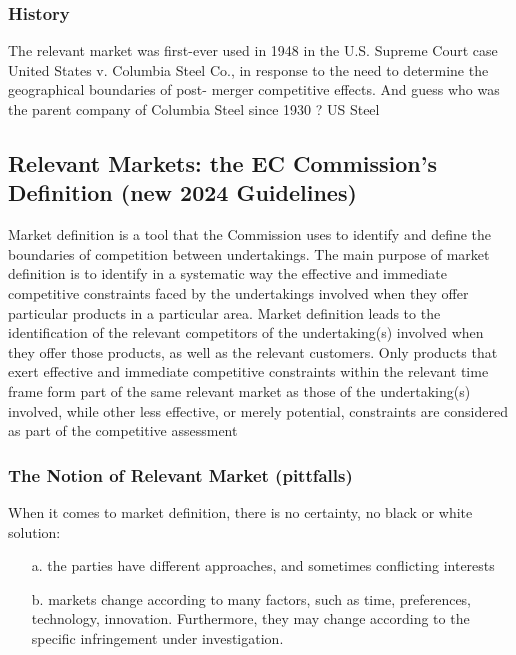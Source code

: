         \subsubsection{History}

            The relevant market was first-ever used in 1948 in the U.S. Supreme Court case United States v. Columbia Steel Co., in response to the need to determine the geographical boundaries of post- merger competitive effects. And guess who was the parent company of Columbia Steel since 1930 ? US Steel

    \subsection{Relevant Markets: the EC Commission’s Definition (new 2024 Guidelines)}

        Market definition is a tool that the Commission uses to identify and define the boundaries of competition between undertakings. The main purpose of market definition is to identify in a systematic way the effective and immediate competitive constraints faced by the undertakings involved when they offer particular products in a particular area. Market definition leads to the identification of the relevant competitors of the undertaking(s) involved when they offer those products, as well as the relevant customers. Only products that exert effective and immediate competitive constraints within the relevant time frame form part of the same relevant market as those of the undertaking(s) involved, while other less effective, or merely potential, constraints are considered as part of the competitive assessment

        \subsubsection{The Notion of Relevant Market (pittfalls)}

            When it comes to market definition, there is no certainty, no black or white solution:
            \begin{enumerate}
                \item[a.] the parties have different approaches, and sometimes conflicting interests
                \item[b.] markets change according to many factors, such as time, preferences, technology, innovation. Furthermore, they may change according to the specific infringement under investigation.
            \end{enumerate}

